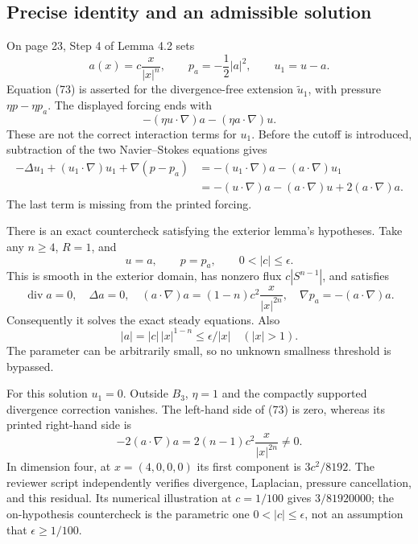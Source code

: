 \documentclass[10pt]{article}
\begin{document}
\subsection*{Precise identity and an admissible solution}
On page 23, Step 4 of Lemma 4.2 sets \[a(x)=c\frac{x}{|x|^n},\qquad p_a=-\frac12|a|^2,\qquad u_1=u-a.\] Equation (73) is asserted for the divergence-free extension \(\widetilde u_1\), with pressure \(\eta p-\eta p_a\). The displayed forcing ends with \[-(\eta u\cdot\nabla)a-(\eta a\cdot\nabla)u.\] These are not the correct interaction terms for \(u_1\). Before the cutoff is introduced, subtraction of the two Navier–Stokes equations gives \[\begin{aligned}
-\Delta u_1+(u_1\cdot\nabla)u_1+\nabla(p-p_a)
 & =-(u_1\cdot\nabla)a-(a\cdot\nabla)u_1\\
 & =-(u\cdot\nabla)a-(a\cdot\nabla)u
       +2(a\cdot\nabla)a.\end{aligned}\] The last term is missing from the printed forcing.\par
There is an exact countercheck satisfying the exterior lemma’s hypotheses. Take any \(n\geq4\), \(R=1\), and \[u=a,\qquad p=p_a,\qquad 0<|c|\leq\epsilon.\] This is smooth in the exterior domain, has nonzero flux \(c|S^{n-1}|\), and satisfies \[\operatorname{div}a=0,\quad \Delta a=0,\quad
(a\cdot\nabla)a=(1-n)c^2\frac{x}{|x|^{2n}},\quad
\nabla p_a=-(a\cdot\nabla)a.\] Consequently it solves the exact steady equations. Also \[|a|=|c|\,|x|^{1-n}\leq\epsilon/|x|\quad (|x|>1).\] The parameter can be arbitrarily small, so no unknown smallness threshold is bypassed.\par
For this solution \(u_1=0\). Outside \(B_3\), \(\eta=1\) and the compactly supported divergence correction vanishes. The left-hand side of (73) is zero, whereas its printed right-hand side is \[-2(a\cdot\nabla)a=2(n-1)c^2\frac{x}{|x|^{2n}}\ne0.\] In dimension four, at \(x=(4,0,0,0)\) its first component is \(3c^2/8192\). The reviewer script independently verifies divergence, Laplacian, pressure cancellation, and this residual. Its numerical illustration at \(c=1/100\) gives \(3/81920000\); the on-hypothesis countercheck is the parametric one \(0<|c|\leq\epsilon\), not an assumption that \(\epsilon\geq1/100\).\par
\end{document}
